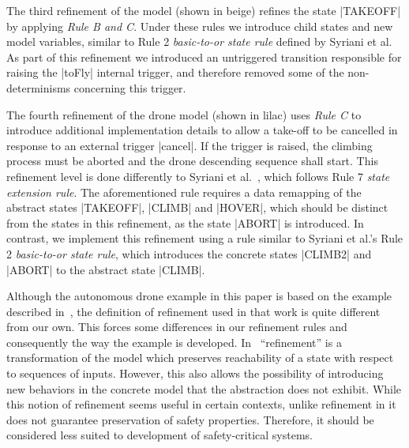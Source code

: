 The third refinement of the model (shown in beige) refines the state |TAKEOFF| by applying \emph{Rule B and C}. 
Under these rules we introduce child states and new model variables, similar to Rule 2 \emph{basic-to-or state rule} defined by Syriani et al.~\cite{Syriani_2019}
As part of this refinement we introduced an untriggered transition responsible for raising the |toFly| internal trigger, and therefore removed some of the non-determinisms concerning this trigger.

The fourth refinement of the drone model (shown in lilac) uses \emph{Rule C} to introduce additional implementation details to 
allow a take-off to be cancelled in response to an external trigger |cancel|.
If the trigger is raised, the climbing process must be aborted and the drone descending sequence shall start. 
This refinement level is done differently to Syriani et al.~\cite{Syriani_2019}, which follows Rule 7 \emph{state extension rule}. 
The aforementioned rule requires a data remapping of the abstract states |TAKEOFF|, |CLIMB| and |HOVER|, which should be distinct from the states in this  refinement, as the state |ABORT| is introduced.
In contrast, we implement this refinement using a rule similar to Syriani et al.'s  Rule 2 \emph{basic-to-or state rule}, which introduces the concrete states |CLIMB2| and |ABORT| to the abstract state |CLIMB|.

Although the autonomous drone example in this paper is based on the
example described in~\cite{Syriani_2019}, the definition of refinement
used in that work is quite different from our own. This forces some
differences in our refinement rules and consequently the way the
example is developed.  In~\cite{Syriani_2019} ``refinement'' is a
transformation of the model which preserves reachability of a state
with respect to sequences of inputs. However, this also allows the
possibility of introducing new behaviors in the concrete model that
the abstraction does not exhibit. While this notion of refinement
seems useful in certain contexts, unlike refinement in \EventB it does
not guarantee preservation of safety properties. Therefore, it should
be considered less suited to development of safety-critical systems.

